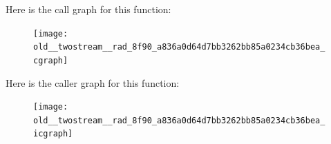 Here is the call graph for this function\+:
\nopagebreak
\begin{figure}[H]
\begin{center}
\leavevmode
\texttt{[image: old\_\_twostream\_\_rad\_8f90\_a836a0d64d7bb3262bb85a0234cb36bea\_cgraph]}
\end{center}
\end{figure}
Here is the caller graph for this function\+:
\nopagebreak
\begin{figure}[H]
\begin{center}
\leavevmode
\texttt{[image: old\_\_twostream\_\_rad\_8f90\_a836a0d64d7bb3262bb85a0234cb36bea\_icgraph]}
\end{center}
\end{figure}
